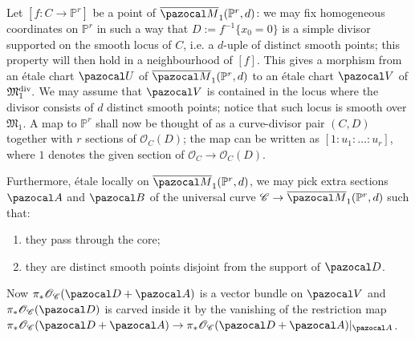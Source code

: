 \documentclass[11pt]{amsart}
\newcommand{\PP}{\mathbb P}
\newcommand{\OO}{\mathcal O}
\renewcommand{\to}{\rightarrow}
\newcommand{\cC}{\mathcal C}
\newcommand{\oM}{\overline{\pazocal M}}
\theoremstyle{plain}
\theoremstyle{definition}
\begin{document}
Let $[f\colon C\to \PP^r]$ be a point of $\oM_1(\PP^r,d)$: we may fix homogeneous coordinates on $\PP^r$ in such a way that $D:=f^{-1}\{x_0=0\}$ is a simple divisor supported on the smooth locus of $C$, i.e. a $d$-uple of distinct smooth points; this property will then hold in a neighbourhood of $[f]$. This gives a morphism from an \'{e}tale chart $\pazocal U$ of $\oM_1(\PP^r,d)$ to an \'{e}tale chart $\pazocal V$ of $\mathfrak M_{1}^{\rm{div}}.$ We may assume that $\pazocal V$ is contained in the locus where the divisor consists of $d$ distinct smooth points; notice  that such locus is smooth over $\mathfrak M_{1}$. A map to $\PP^r$ shall now be thought of as a curve-divisor pair $(C,D)$ together with $r$ sections of $\mathcal O_C(D)$; the map can be written as $[1:u_1:\ldots:u_r]$, where $1$ denotes the given section of $\mathcal O_C\to\mathcal O_C(D)$.


Furthermore, \'{e}tale locally on $\oM_1(\PP^r,d)$, we may pick extra sections $\pazocal A$ and $\pazocal B$ of the universal curve $\cC\to\oM_1(\PP^r,d)$ such that:
\begin{enumerate}
\item they pass through the core;
\item they are distinct smooth points disjoint from the support of $\pazocal D$. 
\end{enumerate}
Now  $\pi_*\OO_{\cC}(\pazocal D+\pazocal A)$ is a vector bundle on $\pazocal V$ and $\pi_*\OO_{\cC}(\pazocal D)$ is carved inside it by the vanishing of the restriction map $\pi_*\OO_{\cC}(\pazocal D+\pazocal A)\to\pi_*\OO_{\cC}(\pazocal D+\pazocal A)\rvert_{\pazocal A}$.
\end{document}
